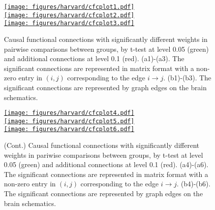 \documentclass[12pt,reqno]{amsart}
\theoremstyle{definition}
\begin{document}
\begin{figure}[h!]
    \centering
    \href{https://drive.google.com/file/d/1T9HxdIIblqNOTtf5CDgi2LFbSLtEf_-U/view?usp=sharing}{\texttt{[image: figures/harvard/cfcplot1.pdf]}}\\
    \href{https://drive.google.com/file/d/1-smROT0-TXLNvm5-YmElIklf2DOEqG3b/view?usp=sharing}{\texttt{[image: figures/harvard/cfcplot2.pdf]}}\\
    \href{https://drive.google.com/file/d/1-vMBZ1dpo90ZlQJUgGVLjtzqOp5-wQAL/view?usp=sharing}{\texttt{[image: figures/harvard/cfcplot3.pdf]}}
    \caption{Causal functional connections with significantly different weights in pairwise comparisons between groups, by t-test at level 0.05 (green) and additional connections at level 0.1 (red). (a1)-(a3). The significant connections are represented in matrix format with a non-zero entry in $(i,j)$ corresponding to the edge $i\rightarrow j$. (b1)-(b3). The significant connections are represented by graph edges on the brain schematics.}%
    \label{fig:pwcomp0.05}
\end{figure}
\begin{figure}[h!]
    \ContinuedFloat
    \centering
    \href{https://drive.google.com/file/d/1mzrBhWfa-l4cs40XAdBX2SxuqdUAUICh/view?usp=sharing}{\texttt{[image: figures/harvard/cfcplot4.pdf]}}\\
    \href{https://drive.google.com/file/d/1jnpMCf0q8rJgC4tQsjkoU7twVQv6QLL1/view?usp=sharing}{\texttt{[image: figures/harvard/cfcplot5.pdf]}}\\
    \href{https://drive.google.com/file/d/1_2hyuz3kL-rIVTwJP7I5uyFWjRacz5kZ/view?usp=sharing}{\texttt{[image: figures/harvard/cfcplot6.pdf]}}
    \caption{(Cont.) Causal functional connections with significantly different weights in pariwise comparisons between groups, by t-test at level 0.05 (green) and additional connections at level 0.1 (red). (a4)-(a6). The significant connections are represented in matrix format with a non-zero entry in $(i,j)$ corresponding to the edge $i\rightarrow j$. (b4)-(b6). The significant connections are represented by graph edges on the brain schematics.}
    \label{fig:pwcomp0.05}
\end{figure}
\end{document}

